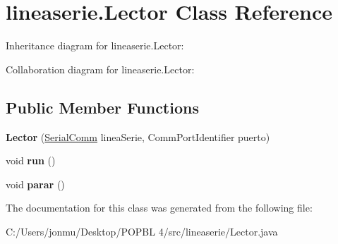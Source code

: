 \hypertarget{classlineaserie_1_1_lector}{}\section{lineaserie.\+Lector Class Reference}
\label{classlineaserie_1_1_lector}


Inheritance diagram for lineaserie.\+Lector\+:


Collaboration diagram for lineaserie.\+Lector\+:
\subsection*{Public Member Functions}
\begin{DoxyCompactItemize}
\item 
\mbox{\label{classlineaserie_1_1_lector_a49947c6538f2b7e0b423b7664c252ed3}} 
{\bfseries Lector} (\mbox{\hyperlink{classlineaserie_1_1_serial_comm}{Serial\+Comm}} linea\+Serie, Comm\+Port\+Identifier puerto)
\item 
\mbox{\label{classlineaserie_1_1_lector_ac57211de70ab9a4bd7aa80ab491f7fca}} 
void {\bfseries run} ()
\item 
\mbox{\label{classlineaserie_1_1_lector_a7abfb09ecc456931b8948a058cedf4c8}} 
void {\bfseries parar} ()
\end{DoxyCompactItemize}


The documentation for this class was generated from the following file\+:\begin{DoxyCompactItemize}
\item 
C\+:/\+Users/jonmu/\+Desktop/\+P\+O\+P\+B\+L 4/src/lineaserie/Lector.\+java\end{DoxyCompactItemize}

